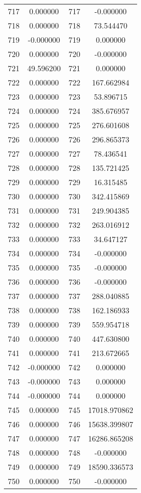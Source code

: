 \documentclass[12pt]{article}
\begin{document}
\begin{longtable}{@{}cccc@{}}
717 & 0.000000 & 717 & -0.000000 \\
718 & 0.000000 & 718 & 73.544470 \\
719 & -0.000000 & 719 & 0.000000 \\
720 & 0.000000 & 720 & -0.000000 \\
721 & 49.596200 & 721 & 0.000000 \\
722 & 0.000000 & 722 & 167.662984 \\
723 & 0.000000 & 723 & 53.896715 \\
724 & 0.000000 & 724 & 385.676957 \\
725 & 0.000000 & 725 & 276.601608 \\
726 & 0.000000 & 726 & 296.865373 \\
727 & 0.000000 & 727 & 78.436541 \\
728 & 0.000000 & 728 & 135.721425 \\
729 & 0.000000 & 729 & 16.315485 \\
730 & 0.000000 & 730 & 342.415869 \\
731 & 0.000000 & 731 & 249.904385 \\
732 & 0.000000 & 732 & 263.016912 \\
733 & 0.000000 & 733 & 34.647127 \\
734 & 0.000000 & 734 & -0.000000 \\
735 & 0.000000 & 735 & -0.000000 \\
736 & 0.000000 & 736 & -0.000000 \\
737 & 0.000000 & 737 & 288.040885 \\
738 & 0.000000 & 738 & 162.186933 \\
739 & 0.000000 & 739 & 559.954718 \\
740 & 0.000000 & 740 & 447.630800 \\
741 & 0.000000 & 741 & 213.672665 \\
742 & -0.000000 & 742 & 0.000000 \\
743 & -0.000000 & 743 & 0.000000 \\
744 & -0.000000 & 744 & 0.000000 \\
745 & 0.000000 & 745 & 17018.970862 \\
746 & 0.000000 & 746 & 15638.399807 \\
747 & 0.000000 & 747 & 16286.865208 \\
748 & 0.000000 & 748 & -0.000000 \\
749 & 0.000000 & 749 & 18590.336573 \\
750 & 0.000000 & 750 & -0.000000 \\

\end{longtable}
\end{document}
